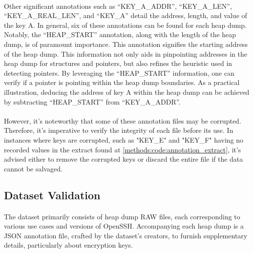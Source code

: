         \paragraph{}Other significant annotations such as ``KEY\_A\_ADDR'', ``KEY\_A\_LEN'', ``KEY\_A\_REAL\_LEN'', and ``KEY\_A'' detail the address, length, and value of the key A. In general, six of these annotations can be found for each heap dump. Notably, the ``HEAP\_START'' annotation, along with the length of the heap dump, is of paramount importance. This annotation signifies the starting address of the heap dump. This information not only aids in pinpointing addresses in the heap dump for \glspl{structure} and \glspl{pointer}, but also refines the heuristic used in detecting \glspl{pointer}. By leveraging the ``HEAP\_START'' information, one can verify if a \gls{pointer} is pointing within the heap dump boundaries. As a practical illustration, deducing the address of key A within the heap dump can be achieved by subtracting ``HEAP\_START'' from ``KEY\_A\_ADDR''.

        \paragraph{}However, it's noteworthy that some of these annotation files may be corrupted. Therefore, it's imperative to verify the integrity of each file before its use. In instances where keys are corrupted, such as "KEY\_E" and "KEY\_F" having no recorded values in the extract found at \ref{methods:code:annotation_extract}, it's advised either to remove the corrupted keys or discard the entire file if the data cannot be salvaged.
    
    \subsection{Dataset Validation}
        \paragraph{}The dataset primarily consists of heap dump RAW files, each corresponding to various use cases and versions of OpenSSH. Accompanying each heap dump is a JSON annotation file, crafted by the dataset's creators, to furnish supplementary details, particularly about encryption keys.
        
